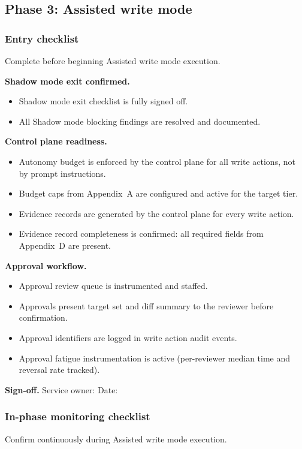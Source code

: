 \documentclass[11pt]{article}
\begin{document}
\subsection{Phase 3: Assisted write mode}

\subsubsection{Entry checklist}
Complete before beginning Assisted write mode execution.

\textbf{Shadow mode exit confirmed.}
\begin{itemize}
  \item Shadow mode exit checklist is fully signed off.
  \item All Shadow mode blocking findings are resolved and documented.
\end{itemize}

\textbf{Control plane readiness.}
\begin{itemize}
  \item Autonomy budget is enforced by the control plane for all write actions, not by prompt instructions.
  \item Budget caps from Appendix~A are configured and active for the target tier.
  \item Evidence records are generated by the control plane for every write action.
  \item Evidence record completeness is confirmed: all required fields from Appendix~D are present.
\end{itemize}

\textbf{Approval workflow.}
\begin{itemize}
  \item Approval review queue is instrumented and staffed.
  \item Approvals present target set and diff summary to the reviewer before confirmation.
  \item Approval identifiers are logged in write action audit events.
  \item Approval fatigue instrumentation is active (per-reviewer median time and reversal rate tracked).
\end{itemize}

\textbf{Sign-off.} Service owner: \underline{\hspace{2in}} \quad Date: \underline{\hspace{1in}}

\subsubsection{In-phase monitoring checklist}
Confirm continuously during Assisted write mode execution.
\end{document}
